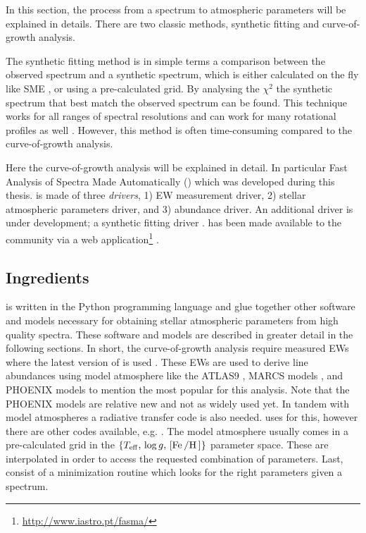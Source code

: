 In this section, the process from a spectrum to atmospheric parameters will be
explained in details. There are two classic methods, synthetic fitting and
curve-of-growth analysis.

The synthetic fitting method is in simple terms a comparison between the
observed spectrum and a synthetic spectrum, which is either calculated on the
fly like SME \citep{Valenti1996}, or using a pre-calculated grid. By analysing
the $\chi^2$ the synthetic spectrum that best match the observed spectrum can be
found. This technique works for all ranges of spectral resolutions and can work
for many rotational profiles as well \citep[see e.g.][]{Tsantaki2017}. However,
this method is often time-consuming compared to the curve-of-growth analysis.

Here the curve-of-growth analysis will be explained in detail. In particular
Fast Analysis of Spectra Made Automatically (\FASMA) which was developed during
this thesis. \FASMA is made of three \emph{drivers}, 1) EW measurement driver,
2) stellar atmospheric parameters driver, and 3) abundance driver. An additional
driver is under development; a synthetic fitting driver \citep{Tsantaki2017}.
\FASMA has been made available to the community via a web
application\footnote{\url{http://www.iastro.pt/fasma/}} \citep{Andreasen2017a}.


\subsection{Ingredients}

\FASMA is written in the Python programming language and glue together other
software and models necessary for obtaining stellar atmospheric parameters from
high quality spectra. These software and models are described in greater detail
in the following sections. In short, the curve-of-growth analysis require
measured EWs where the latest version of \ARES is used \citep{Sousa2015a}. These
EWs are used to derive line abundances using model atmosphere like the ATLAS9
\citep{Kurucz1993}, MARCS models \citep{Gustafson2008}, and PHOENIX models
\citep{Husser2013} to mention the most popular for this analysis. Note that the
PHOENIX models are relative new and not as widely used yet. In tandem with model
atmospheres a radiative transfer code is also needed. \FASMA uses \MOOG
\citep{Sneden1973} for this, however there are other codes available, e.g.
. The model atmosphere usually comes
in a pre-calculated grid in the $\{T_\mathrm{eff},\,\log
g,\,[\ion{Fe}/\ion{H}]\}$ parameter space. These are interpolated in order to
access the requested combination of parameters. Last, \FASMA consist of a
minimization routine which looks for the right parameters given a spectrum.



